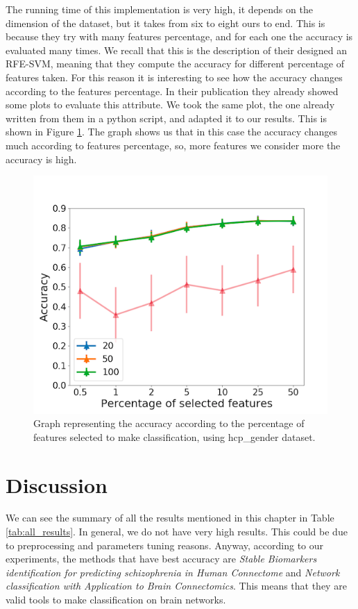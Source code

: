 The running time of this implementation is very high, it depends on the dimension of the dataset, but it takes from six to eight ours to end. This is because they try with many features percentage, and for each one the accuracy is evaluated many times. We recall that this is the description of their designed an RFE-SVM, meaning that they compute the accuracy for different percentage of features taken. For this reason it is interesting to see how the accuracy changes according to the features percentage. In their publication they already showed some plots to evaluate this attribute. We took the same plot, the one already written from them in a python script, and adapted it to our results. This is shown in Figure \ref{fig:diagram20}. The graph shows us that in this case the accuracy changes much according to features percentage, so, more features we consider more the accuracy is high. 

\begin{figure}[htbp]
	\centering
	\includegraphics[scale=0.5]{Immagini/fc_83_hcp_gender.png}
	\caption{Graph representing the accuracy according to the percentage of features selected to make classification, using hcp\_gender dataset.}
	\label{fig:diagram20}
\end{figure}

\newpage
\section{Discussion}

We can see the summary of all the results mentioned in this chapter in Table \ref{tab:all_results}. In general, we do not have very high results. This could be due to preprocessing and parameters tuning reasons. Anyway, according to our experiments, the methods that have best accuracy are \textit{Stable Biomarkers identification for predicting schizophrenia in Human Connectome} and \textit{Network classification with Application to Brain Connectomics}. This means that they are valid tools to make classification on brain networks. 
\vspace{0.5cm}

